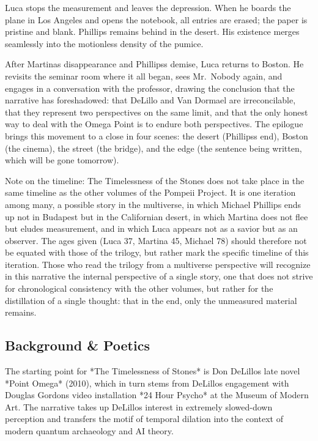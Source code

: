 \documentclass[
  ngerman,
]{article}
\begin{document}
Luca stops the measurement and leaves the depression. When he boards the
plane in Los Angeles and opens the notebook, all entries are erased; the
paper is pristine and blank. Phillips remains behind in the desert. His
existence merges seamlessly into the motionless density of the pumice.

After Martina\textquotesingle s disappearance and
Phillips\textquotesingle s demise, Luca returns to Boston. He revisits
the seminar room where it all began, sees Mr.~Nobody again, and engages
in a conversation with the professor, drawing the conclusion that the
narrative has foreshadowed: that DeLillo and Van Dormael are
irreconcilable, that they represent two perspectives on the same limit,
and that the only honest way to deal with the Omega Point is to endure
both perspectives. The epilogue brings this movement to a close in four
scenes: the desert (Phillips\textquotesingle s end), Boston (the
cinema), the street (the bridge), and the edge (the sentence being
written, which will be gone tomorrow).

Note on the timeline: The Timelessness of the Stones does not take place
in the same timeline as the other volumes of the Pompeii Project. It is
one iteration among many, a possible story in the multiverse, in which
Michael Phillips ends up not in Budapest but in the Californian desert,
in which Martina does not flee but eludes measurement, and in which Luca
appears not as a savior but as an observer. The ages given (Luca 37,
Martina 45, Michael 78) should therefore not be equated with those of
the trilogy, but rather mark the specific timeline of this iteration.
Those who read the trilogy from a multiverse perspective will recognize
in this narrative the internal perspective of a single story, one that
does not strive for chronological consistency with the other volumes,
but rather for the distillation of a single thought: that in the end,
only the unmeasured material remains.

\subsection{Background \& Poetics}\label{background-poetics}

The starting point for *The Timelessness of Stones* is Don
DeLillo\textquotesingle s late novel *Point Omega* (2010), which in turn
stems from DeLillo\textquotesingle s engagement with Douglas
Gordon\textquotesingle s video installation *24 Hour Psycho* at the
Museum of Modern Art. The narrative takes up DeLillo\textquotesingle s
interest in extremely slowed-down perception and transfers the motif of
temporal dilation into the context of modern quantum archaeology and AI
theory.
\end{document}

